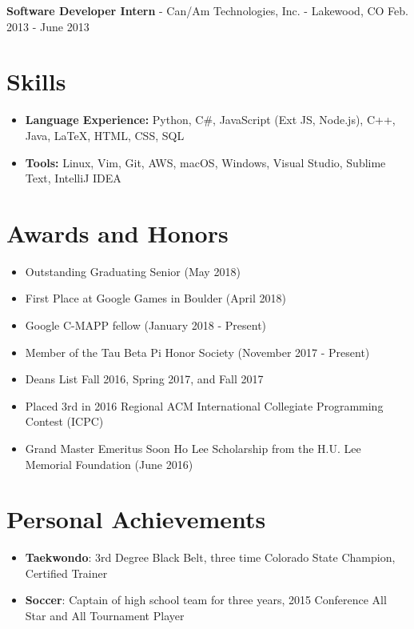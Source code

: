 \documentclass[10pt,letterpaper]{article}
\begin{document}
\vspace{2pt}
\textbf{Software Developer Intern} - Can/Am Technologies, Inc. - Lakewood, CO
\hfill Feb. 2013 - June 2013

\section*{Skills}
{\renewcommand\labelitemi{}
    \renewcommand\leftmargini{0pt}
    \begin{itemize}
        \item \textbf{Language Experience:} Python, C\#, JavaScript (Ext JS,
            Node.js), C++, Java, {\selectfont\LaTeX}, HTML, CSS,
            SQL
        \item \textbf{Tools:} Linux, Vim, Git, AWS, macOS, Windows, Visual
            Studio, Sublime Text, IntelliJ IDEA
    \end{itemize}
}

\section*{Awards and Honors}
\begin{itemize}
    \item Outstanding Graduating Senior (May 2018)
    \item First Place at Google Games in Boulder (April 2018)
    \item Google C-MAPP fellow (January 2018 - Present)
    \item Member of the Tau Beta Pi Honor Society (November 2017 - Present)
    \item Deans List Fall 2016, Spring 2017, and Fall 2017
    \item Placed 3rd in 2016 Regional ACM International Collegiate Programming
        Contest (ICPC)
    \item Grand Master Emeritus Soon Ho Lee Scholarship from the H.U. Lee
        Memorial Foundation (June 2016)
\end{itemize}

\section*{Personal Achievements}
\begin{itemize}
    \item \textbf{Taekwondo}: 3rd Degree Black Belt, three time Colorado State
        Champion, Certified Trainer
    \item \textbf{Soccer}: Captain of high school team for three years, 2015
        Conference All Star and All Tournament Player
\end{itemize}
\end{document}
